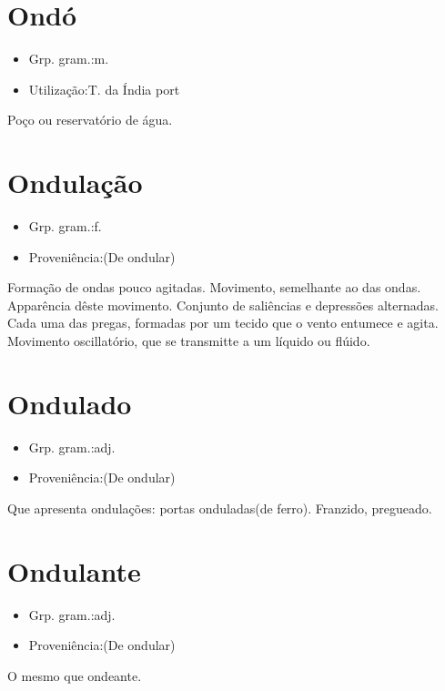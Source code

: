 \section{Ondó}
\begin{itemize}
\item {Grp. gram.:m.}
\end{itemize}
\begin{itemize}
\item {Utilização:T. da Índia port}
\end{itemize}
Poço ou reservatório de água.
\section{Ondulação}
\begin{itemize}
\item {Grp. gram.:f.}
\end{itemize}
\begin{itemize}
\item {Proveniência:(De \textunderscore ondular\textunderscore )}
\end{itemize}
Formação de ondas pouco agitadas.
Movimento, semelhante ao das ondas.
Apparência dêste movimento.
Conjunto de saliências e depressões alternadas.
Cada uma das pregas, formadas por um tecido que o vento entumece e agita.
Movimento oscillatório, que se transmitte a um líquido ou flúido.
\section{Ondulado}
\begin{itemize}
\item {Grp. gram.:adj.}
\end{itemize}
\begin{itemize}
\item {Proveniência:(De \textunderscore ondular\textunderscore )}
\end{itemize}
Que apresenta ondulações: \textunderscore portas onduladas\textunderscore  (de ferro).
Franzido, pregueado.
\section{Ondulante}
\begin{itemize}
\item {Grp. gram.:adj.}
\end{itemize}
\begin{itemize}
\item {Proveniência:(De \textunderscore ondular\textunderscore )}
\end{itemize}
O mesmo que \textunderscore ondeante\textunderscore .
